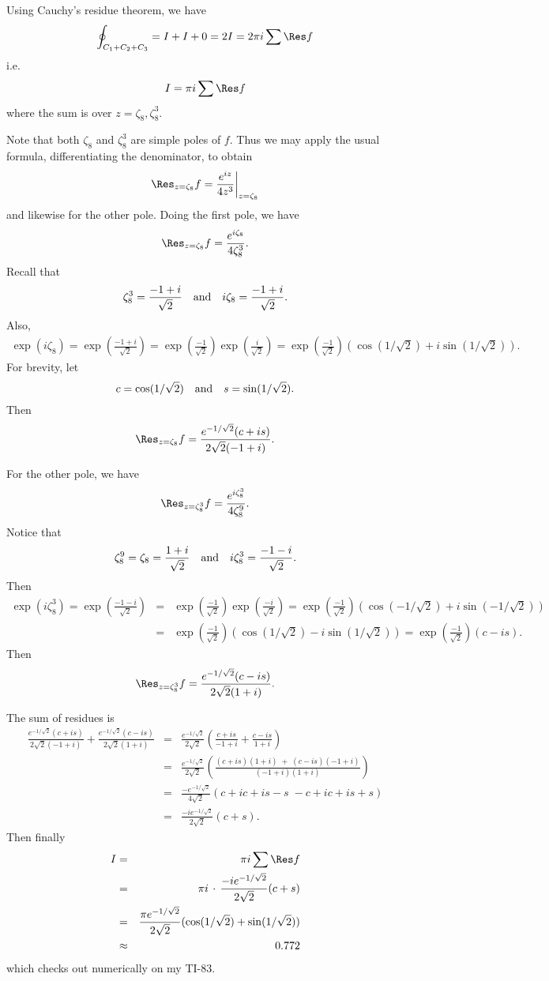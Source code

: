 \documentclass[10pt]{article}
\numberwithin{equation}{subsection}
\begin{document}
Using Cauchy's residue theorem, we have
$$
	\oint_{C_1+C_2+C_3} = I+I+0 = 2I = 2\pi i \sum \Res f
$$
i.e.
$$
	I = \pi i \sum \Res f
$$
where the sum is over $z=\zeta_8, \zeta_8^3$.

Note that both $\zeta_8$ and $\zeta_8^3$ are simple poles of $f$.  Thus we may
apply the usual formula, differentiating the denominator, to obtain
$$
	\Res_{z=\zeta_8} f = \frac{e^{iz}}{4z^3}\pickpipe{z=\zeta_8}
$$
and likewise for the other pole.  Doing the first pole, we have
$$
	\Res_{z=\zeta_8} f = \frac{e^{i\zeta_8}}{4\zeta_8^3}.
$$
Recall that
$$
	\zeta_8^3=\frac{-1+i}{\sqrt 2}
	\quad\textrm{and}\quad
	i\zeta_8=\frac{-1+i}{\sqrt 2}.
$$
Also,
\begin{eqnarray*}
	\exp(i\zeta_8) = \exp\left(\frac{-1+i}{\sqrt 2}\right)
	= \exp\left(\frac{-1}{\sqrt 2}\right) \exp\left(\frac{i}{\sqrt 2}\right)
	= \exp\left(\frac{-1}{\sqrt 2}\right) \left(\cos(1/\sqrt 2) + i\sin(1/\sqrt 2)\right).
\end{eqnarray*}
For brevity, let
$$
	c=\cos(1/\sqrt 2) \quad\textrm{and}\quad s=\sin(1/\sqrt 2).
$$
Then
$$
	\Res_{z=\zeta_8} f = \frac{ e^{-1/\sqrt 2}(c+is)}{2\sqrt 2 (-1+i)}.
$$

For the other pole, we have
$$
	\Res_{z=\zeta_8^3} f = \frac{e^{i\zeta_8^3}}{4\zeta_8^9}.
$$
Notice that
$$
	\zeta_8^9=\zeta_8=\frac{1+i}{\sqrt 2}
	\quad\textrm{and}\quad
	i\zeta_8^3=\frac{-1-i}{\sqrt 2}.
$$
Then
\begin{eqnarray*}
	\exp(i\zeta_8^3) = \exp\left(\frac{-1-i}{\sqrt 2}\right)
	&=& \exp\left(\frac{-1}{\sqrt 2}\right) \exp\left(\frac{-i}{\sqrt 2}\right)
	= \exp\left(\frac{-1}{\sqrt 2}\right) \left(\cos(-1/\sqrt 2) + i\sin(-1/\sqrt 2)\right) \\
	&=& \exp\left(\frac{-1}{\sqrt 2}\right) \left(\cos(1/\sqrt 2) - i\sin(1/\sqrt 2)\right)
	= \exp\left(\frac{-1}{\sqrt 2}\right) (c-is).
\end{eqnarray*}
Then
$$
	\Res_{z=\zeta_8^3} f = \frac{ e^{-1/\sqrt 2}(c-is)}{2\sqrt 2 (1+i)}.
$$

The sum of residues is
\begin{eqnarray*}
	\frac{e^{-1/\sqrt 2}(c+is)}{2\sqrt 2 (-1+i)} +
	\frac{e^{-1/\sqrt 2}(c-is)}{2\sqrt 2 (1+i)}
%
	&=& \frac{e^{-1/\sqrt 2}}{2\sqrt 2} \left(
		\frac{c+is}{-1+i} + \frac{c-is}{1+i}
	\right) \\
%
	&=& \frac{e^{-1/\sqrt 2}}{2\sqrt 2} \left(
		\frac{(c+is)(1+i) \;+\; (c-is)(-1+i)}{(-1+i)(1+i)}
	\right) \\
%
	&=& \frac{-e^{-1/\sqrt 2}}{4\sqrt 2} \left(
		c+ic+is-s \; -c+ic+is+s
	\right) \\
%
	&=& \frac{-ie^{-1/\sqrt 2}}{2\sqrt 2} (c+s).
\end{eqnarray*}
Then finally
\begin{eqnarray*}
	I &=& \pi i \sum \Res f \\
	&=& \pi i \,\cdot\, \frac{-ie^{-1/\sqrt 2}}{2\sqrt 2} (c+s) \\
	&=& \frac{\pi e^{-1/\sqrt 2}}{2\sqrt 2} (\cos(1/\sqrt{2}) + \sin(1/\sqrt{2})) \\
	&\approx& 0.772
\end{eqnarray*}
which checks out numerically on my TI-83.
\end{document}
